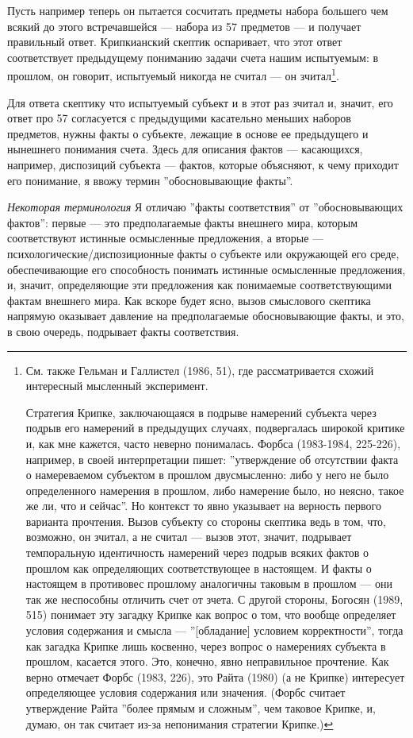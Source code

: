 \documentclass[11pt]{book}
\begin{document}
Пусть например теперь он пытается сосчитать предметы набора большего чем всякий до этого встречавшейся --- набора из 57 предметов --- и получает правильный ответ. Крипкианский скептик оспаривает, что этот ответ соответствует предыдущему пониманию задачи счета нашим испытуемым: в прошлом, он говорит, испытуемый никогда не считал --- он зчитал\footnote{См. также Гельман и Галлистел (1986, 51), где рассматривается схожий интересный мысленный эксперимент.

Стратегия Крипке, заключающаяся в подрыве намерений субъекта через подрыв его намерений в предыдущих случаях, подвергалась широкой критике и, как мне кажется, часто неверно понималась. Форбса (1983-1984, 225-226), например, в своей интерпретации пишет: ''утверждение об отсутствии факта о намереваемом субъектом в прошлом двусмысленно: либо у него не было определенного намерения в прошлом, либо намерение было, но неясно, такое же ли, что и сейчас''. Но контекст то явно указывает на верность первого варианта прочтения. Вызов субъекту со стороны скептика ведь в том, что, возможно, он зчитал, а не считал --- вызов этот, значит, подрывает темпоральную идентичность намерений через подрыв всяких фактов о прошлом как определяющих соответствующее в настоящем. И факты о настоящем в противовес прошлому аналогичны таковым в прошлом --- они так же неспособны отличить счет от зчета. С другой стороны, Богосян (1989, 515) понимает эту загадку Крипке как вопрос о том, что вообще определяет условия содержания и смысла --- ''[обладание] условием корректности'', тогда как загадка Крипке лишь косвенно, через вопрос о намерениях субъекта в прошлом, касается этого. Это, конечно, явно неправильное прочтение. Как верно отмечает Форбс (1983, 226), это Райта (1980) (а не Крипке) интересует определяющее условия содержания или значения. (Форбс считает утверждение Райта ''более прямым и сложным'', чем таковое Крипке, и, думаю, он так считает из-за непонимания стратегии Крипке.)}.

Для ответа скептику что испытуемый субъект и в этот раз зчитал и, значит, его ответ про 57 согласуется с предыдущими касательно меньших наборов предметов, нужны факты о субъекте, лежащие в основе ее предыдущего и нынешнего понимания счета. Здесь для описания фактов --- касающихся, например, диспозиций субъекта --- фактов, которые объясняют, к чему приходит его понимание, я ввожу термин ''обосновывающие факты''.

\textit{Некоторая терминология} \quad Я отличаю ''факты соответствия'' от ''обосновывающих фактов'': первые --- это предполагаемые факты внешнего мира, которым соответствуют истинные осмысленные предложения, а вторые --- психологические/диспозиционные факты о субъекте или окружающей его среде, обеспечивающие его способность понимать истинные осмысленные предложения, и, значит, определяющие эти предложения как понимаемые соответствующими фактам внешнего мира. Как вскоре будет ясно, вызов смыслового скептика напрямую оказывает давление на предполагаемые обосновывающие факты, и это, в свою очередь, подрывает факты соответствия.
\end{document}
